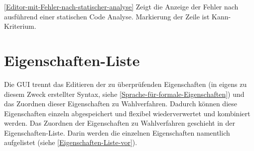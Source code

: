 \documentclass[a4paper]{scrreprt}
\begin{document}
\ref{Editor-mit-Fehler-nach-statischer-analyse} Zeigt die Anzeige der Fehler nach ausführend einer statischen Code Analyse. Markierung der Zeile ist Kann-Kriterium.

\section{Eigenschaften-Liste}
Die GUI trennt das Editieren der zu überprüfenden Eigenschaften (in eigens zu diesem Zweck erstellter Syntax, siehe \ref{Sprache-für-formale-Eigenschaften}) und das Zuordnen dieser Eigenschaften zu Wahlverfahren. Dadurch können diese Eigenschaften einzeln abgespeichert und flexibel wiederverwertet und kombiniert werden. Das Zuordnen der Eigenschaften zu Wahlverfahren geschieht in der Eigenschaften-Liste. Darin werden die einzelnen Eigenschaften namentlich aufgelistet (siehe \ref{Eigenschaften-Liste-vor}). 
\end{document}
